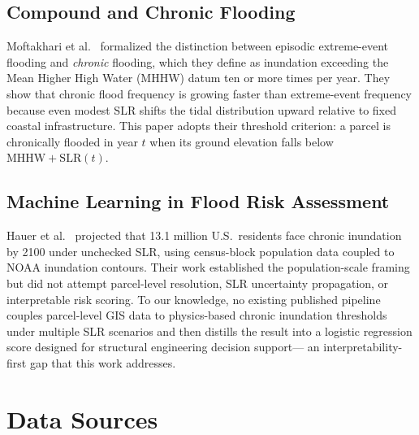 \documentclass[conference]{IEEEtran}
\begin{document}
\subsection*{Compound and Chronic Flooding}

Moftakhari et al.~\cite{moftakhari2017} formalized the distinction between
episodic extreme-event flooding and \textit{chronic} flooding, which they
define as inundation exceeding the Mean Higher High Water (MHHW) datum
ten or more times per year.
They show that chronic flood frequency is growing faster than extreme-event
frequency because even modest SLR shifts the tidal distribution upward
relative to fixed coastal infrastructure.
This paper adopts their threshold criterion: a parcel is chronically
flooded in year $t$ when its ground elevation falls below
$\text{MHHW} + \text{SLR}(t)$.

\subsection*{Machine Learning in Flood Risk Assessment}

Hauer et al.~\cite{hauer2016} projected that 13.1 million U.S.\ residents
face chronic inundation by 2100 under unchecked SLR, using census-block
population data coupled to NOAA inundation contours.
Their work established the population-scale framing but did not attempt
parcel-level resolution, SLR uncertainty propagation, or interpretable
risk scoring.
To our knowledge, no existing published pipeline couples parcel-level
GIS data to physics-based chronic inundation thresholds under multiple
SLR scenarios and then distills the result into a logistic regression
score designed for structural engineering decision support—
an interpretability-first gap that this work addresses.


\section{Data Sources}
\label{sec:data}
\end{document}
